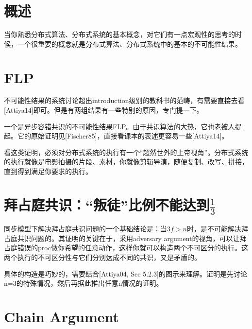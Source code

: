 \documentclass[UTF8]{ctexrep}
\begin{document}
\section{概述}

当你熟悉分布式算法、分布式系统的基本概念，对它们有一点宏观性的思考的时候，一个很重要的概念就是分布式算法、分布式系统中的基本的不可能性结果。



\section{FLP}

不可能性结果的系统讨论超出introduction级别的教科书的范畴，有需要直接去看[Attiya14]即可。但是有两组结果有一些特别的原因，专门提一下。

一个是异步容错共识的不可能性结果FLP。由于共识算法的大热，它也老被人提起。它的原始证明见[Fischer85]，直接看课本的表述更容易一些[Attiya14]。

看这类证明，必须对分布式系统的执行有一个“超然世外的上帝视角”。分布式系统的执行就像是电影拍摄的片段、素材，你就像剪辑导演，随便复制、改写、拼接，直到得到满足你要求的执行。

\section{拜占庭共识：“叛徒”比例不能达到$\frac{1}{3}$}

同步模型下解决拜占庭共识问题的一个基础结论是：当$3f>n$时，是不可能解决拜占庭共识问题的。其证明的关键在于，采用adversary argument的视角，可以让拜占庭错误的proc做你希望的任意动作，这样你就可以构造两个不可区分的执行。这两个执行的不可区分性与它们分别达成不同的共识，又是矛盾的。

具体的构造是巧妙的，需要结合[Attiya04, Sec 5.2.3]的图示来理解。证明是先讨论n=3的特殊情况，然后再据此推出任意n情况的证明。

\section{Chain Argument}
\end{document}
